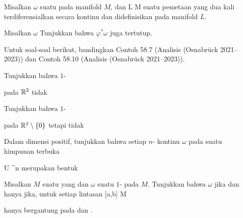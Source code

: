 {}
{

Misalkan $\omega$ suatu
 
pada manifold $M$, dan
\maabb {\varphi} { L } { M
} {}
suatu pemetaan yang dua kali terdiferensialkan secara kontinu dan didefinisikan pada manifold $L$.

 {Misalkan $\omega$
Tunjukkan bahwa
$\varphi^*\omega$ juga tertutup.
}

}
{} {}

Untuk soal-soal berikut, bandingkan
Contoh 58.7 (Analisis (Osnabrück 2021–2023))
dan
Contoh 58.10 (Analisis (Osnabrück 2021–2023)).

{}
{

Tunjukkan bahwa
$1$-

 {  }

pada ${\mathbb R}^2$ tidak

}
{} {}

{}
{

Tunjukkan bahwa
$1$-

 {  }

pada ${\mathbb R}^2 \setminus \{0\}$
tetapi tidak

}
{} {}

{}
{

Dalam dimensi positif, tunjukkan bahwa setiap
$n$-
kontinu $\omega$ pada suatu himpunan terbuka

\mavergleichskette
{\vergleichskette
{U
}
{ \subseteq }{\R^n
}
{  }{
}
{    }{
}
{   }{
}
}
{}{}{}
merupakan bentuk

}
{} {}

{}
{

Misalkan $M$ suatu
yang
dan $\omega$ suatu
$1$-
pada $M$. Tunjukkan bahwa $\omega$
jika dan hanya jika, untuk setiap lintasan
\maabbdisp {\gamma} { [a,b] } { M
} {}

\mathl{\int_\gamma \omega}{} hanya bergantung pada
 dan
.

}
{} {}


